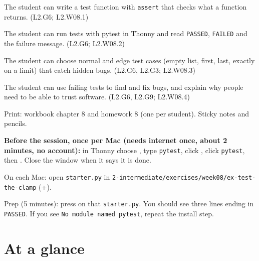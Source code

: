 
\begin{objectives}
  \item The student can write a test function with \texttt{assert} that checks what a function returns. (L2.G6; L2.W08.1)
  \item The student can run tests with pytest in Thonny and read \texttt{PASSED}, \texttt{FAILED} and the failure message. (L2.G6; L2.W08.2)
  \item The student can choose normal and edge test cases (empty list, first, last, exactly on a limit) that catch hidden bugs. (L2.G6, L2.G3; L2.W08.3)
  \item The student can use failing tests to find and fix bugs, and explain why people need to be able to trust software. (L2.G6, L2.G9; L2.W08.4)
\end{objectives}

\begin{materials}
  \item Print: workbook chapter 8 and homework 8 (one per student). Sticky notes and pencils.
  \item \textbf{Before the session, once per Mac (needs internet once, about 2 minutes, no account):} in Thonny choose ,
        type \texttt{pytest}, click , click \texttt{pytest}, then . Close the window when it says it is done.
  \item On each Mac: open \texttt{starter.py} in \texttt{2-intermediate/exercises/week08/ex-test-the-clamp} (+).
  \item Prep (5 minutes): press  on that \texttt{starter.py}. You should see three lines ending in \texttt{PASSED}. If you see
        \texttt{No module named pytest}, repeat the install step.
\end{materials}

\section{At a glance}
\begin{timeplan}
\end{timeplan}

